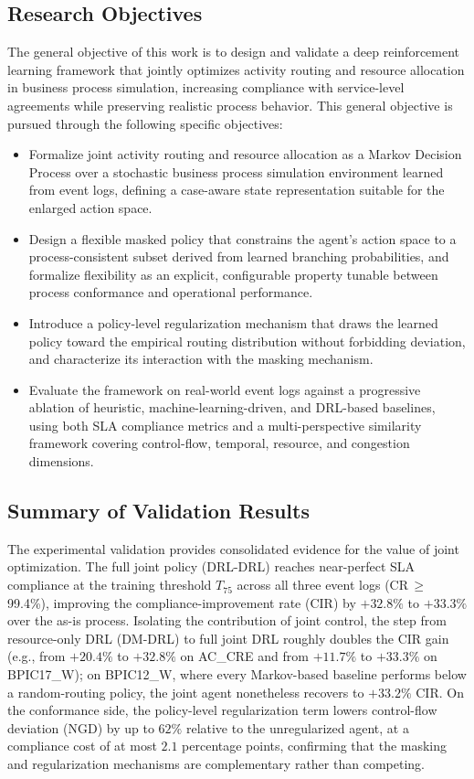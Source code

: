\documentclass[journal,onecolumn]{IEEEtran}
\begin{document}
\subsection*{Research Objectives}

The general objective of this work is to design and validate a deep
reinforcement learning framework that jointly optimizes activity routing and
resource allocation in business process simulation, increasing compliance with
service-level agreements while preserving realistic process behavior. This
general objective is pursued through the following specific objectives:

\begin{itemize}
\item Formalize joint activity routing and resource allocation as a Markov
Decision Process over a stochastic business process simulation environment
learned from event logs, defining a case-aware state representation suitable for
the enlarged action space.
\item Design a flexible masked policy that constrains the agent's action space to
a process-consistent subset derived from learned branching probabilities, and
formalize flexibility as an explicit, configurable property tunable between
process conformance and operational performance.
\item Introduce a policy-level regularization mechanism that draws the learned
policy toward the empirical routing distribution without forbidding deviation,
and characterize its interaction with the masking mechanism.
\item Evaluate the framework on real-world event logs against a progressive
ablation of heuristic, machine-learning-driven, and DRL-based baselines, using
both SLA compliance metrics and a multi-perspective similarity framework covering
control-flow, temporal, resource, and congestion dimensions.
\end{itemize}

\subsection*{Summary of Validation Results}

The experimental validation provides consolidated evidence for the value of
joint optimization. The full joint policy (DRL-DRL) reaches near-perfect SLA
compliance at the training threshold $T_{75}$ across all three event logs
(CR\,$\geq$\,99.4\%), improving the compliance-improvement rate (CIR) by
$+32.8\%$ to $+33.3\%$ over the as-is process. Isolating the contribution of
joint control, the step from resource-only DRL (DM-DRL) to full joint DRL
roughly doubles the CIR gain (e.g., from $+20.4\%$ to $+32.8\%$ on
AC\_CRE and from $+11.7\%$ to $+33.3\%$ on BPIC17\_W); on BPIC12\_W, where every
Markov-based baseline performs below a random-routing policy, the joint agent
nonetheless recovers to $+33.2\%$ CIR. On the conformance side, the policy-level
regularization term lowers control-flow deviation (NGD) by up to $62\%$ relative
to the unregularized agent, at a compliance cost of at most $2.1$ percentage
points, confirming that the masking and regularization mechanisms are
complementary rather than competing.
\end{document}

